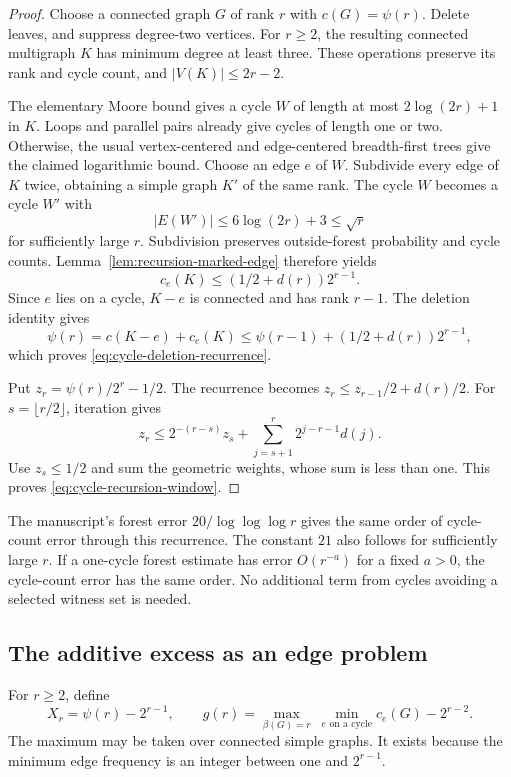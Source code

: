 \begin{proof}
Choose a connected graph $G$ of rank $r$ with $c(G)=\psi(r)$.
Delete leaves, and suppress degree-two vertices.
For $r\ge2$, the resulting connected multigraph $K$ has minimum degree at least three.
These operations preserve its rank and cycle count, and $|V(K)|\le2r-2$.

The elementary Moore bound gives a cycle $W$ of length at most $2\log(2r)+1$ in $K$.
Loops and parallel pairs already give cycles of length one or two.
Otherwise, the usual vertex-centered and edge-centered breadth-first trees give the claimed logarithmic bound.
Choose an edge $e$ of $W$.
Subdivide every edge of $K$ twice, obtaining a simple graph $K'$ of the same rank.
The cycle $W$ becomes a cycle $W'$ with
\[
 |E(W')|\le6\log(2r)+3\le\sqrt r
\]
for sufficiently large $r$.
Subdivision preserves outside-forest probability and cycle counts.
Lemma~\ref{lem:recursion-marked-edge} therefore yields
\[
 c_e(K)\le(1/2+d(r))2^{r-1}.
\]
Since $e$ lies on a cycle, $K-e$ is connected and has rank $r-1$.
The deletion identity gives
\[
 \psi(r)=c(K-e)+c_e(K)
 \le\psi(r-1)+(1/2+d(r))2^{r-1},
\]
which proves \eqref{eq:cycle-deletion-recurrence}.

Put $z_r=\psi(r)/2^r-1/2$.
The recurrence becomes $z_r\le z_{r-1}/2+d(r)/2$.
For $s=\lfloor r/2\rfloor$, iteration gives
\[
 z_r\le2^{-(r-s)}z_s+
 \sum_{j=s+1}^{r}2^{j-r-1}d(j).
\]
Use $z_s\le1/2$ and sum the geometric weights, whose sum is less than one.
This proves \eqref{eq:cycle-recursion-window}.
\end{proof}

The manuscript's forest error $20/\log\log\log r$ gives the same order of cycle-count error through this recurrence.
The constant $21$ also follows for sufficiently large $r$.
If a one-cycle forest estimate has error $O(r^{-a})$ for a fixed $a>0$, the cycle-count error has the same order.
No additional term from cycles avoiding a selected witness set is needed.

\subsection{The additive excess as an edge problem}

For $r\ge2$, define
\[
 X_r=\psi(r)-2^{r-1},\qquad
 g(r)=\max_{\beta(G)=r}\ \min_{e\text{ on a cycle}}c_e(G)-2^{r-2}.
\]
The maximum may be taken over connected simple graphs.
It exists because the minimum edge frequency is an integer between one and $2^{r-1}$.

